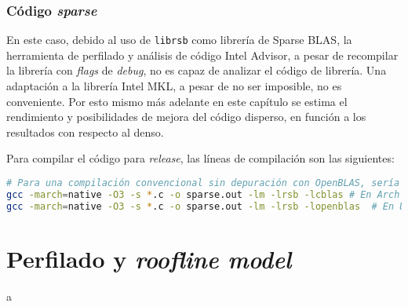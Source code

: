\subsubsection{Código \textit{sparse}}
En este caso, debido al uso de \texttt{librsb} como librería de Sparse BLAS, la herramienta de perfilado y análisis de código Intel Advisor, a pesar de recompilar la librería con \textit{flags} de \textit{debug}, no es capaz de analizar el código de librería. Una adaptación a la librería Intel MKL, a pesar de no ser imposible, no es conveniente. Por esto mismo más adelante en este capítulo se estima el rendimiento y posibilidades de mejora del código disperso, en función a los resultados con respecto al denso.

Para compilar el código para \textit{release}, las líneas de compilación son las siguientes:

\begin{lstlisting}[language=bash]
# Para una compilación convencional sin depuración con OpenBLAS, sería necesario únicamente ejecutar
gcc -march=native -O3 -s *.c -o sparse.out -lm -lrsb -lcblas # En Arch Linux
gcc -march=native -O3 -s *.c -o sparse.out -lm -lrsb -lopenblas  # En Ubuntu
\end{lstlisting}

\section{Perfilado y \textit{roofline model}}
\label{sec:perfilado_roofline}
a